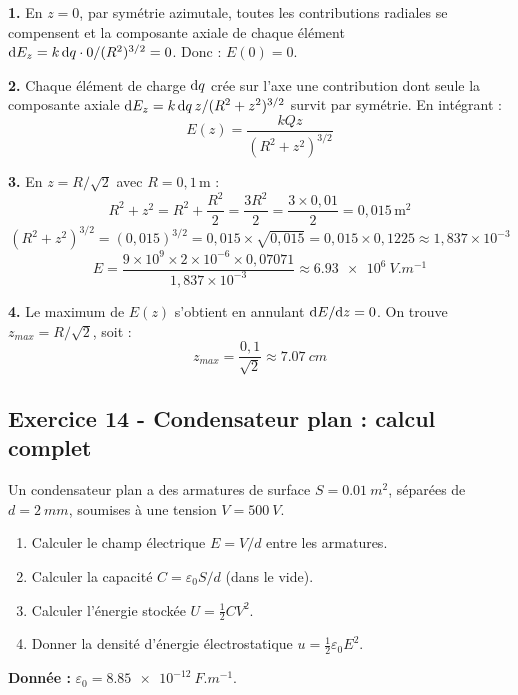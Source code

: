 \documentclass[12pt,a4paper]{article}
\begin{document}
\begin{boitecorrige}
\textbf{1.} En $z = 0$, par symétrie azimutale, toutes les contributions radiales se compensent et la composante axiale de chaque élément $\mathrm{d} E_z = k\,\mathrm{d} q\cdot 0/(R^2)^{3/2} = 0$. Donc : $\boxed{E(0) = 0}$.

\textbf{2.} Chaque élément de charge $\mathrm{d} q$ crée sur l'axe une contribution dont seule la composante axiale $\mathrm{d} E_z = k\,\mathrm{d} q\,z/(R^2+z^2)^{3/2}$ survit par symétrie. En intégrant :
\[
E(z) = \frac{kQz}{(R^2+z^2)^{3/2}}
\]

\textbf{3.} En $z = R/\sqrt{2}$ avec $R = 0{,}1\,\text{m}$ :
\[
R^2 + z^2 = R^2 + \frac{R^2}{2} = \frac{3R^2}{2} = \frac{3\times0{,}01}{2} = 0{,}015\,\text{m}^2
\]
\[
(R^2+z^2)^{3/2} = (0{,}015)^{3/2} = 0{,}015\times\sqrt{0{,}015} = 0{,}015\times0{,}1225 \approx 1{,}837\times10^{-3}
\]
\[
E = \frac{9\times10^9\times2\times10^{-6}\times0{,}07071}{1{,}837\times10^{-3}} \approx \qty{6.93e6}{V.m^{-1}}
\]

\textbf{4.} Le maximum de $E(z)$ s'obtient en annulant $\mathrm{d} E/\mathrm{d} z = 0$. On trouve $z_{max} = R/\sqrt{2}$, soit :
\[
z_{max} = \frac{0{,}1}{\sqrt{2}} \approx \qty{7.07}{cm}
\]
\end{boitecorrige}

\subsection*{Exercice 14 - Condensateur plan : calcul complet \niveau{\facile}}

\begin{boiteexercice}
Un condensateur plan a des armatures de surface $S = \qty{0.01}{m^2}$, séparées de $d = \qty{2}{mm}$, soumises à une tension $V = \qty{500}{V}$.
\begin{enumerate}
  \item Calculer le champ électrique $E = V/d$ entre les armatures.
  \item Calculer la capacité $C = \varepsilon_0 S/d$ (dans le vide).
  \item Calculer l'énergie stockée $U = \frac{1}{2}CV^2$.
  \item Donner la densité d'énergie électrostatique $u = \frac{1}{2}\varepsilon_0 E^2$.
\end{enumerate}
\textbf{Donnée :} $\varepsilon_0 = \qty{8.85e-12}{F.m^{-1}}$.
\end{boiteexercice}
\end{document}
